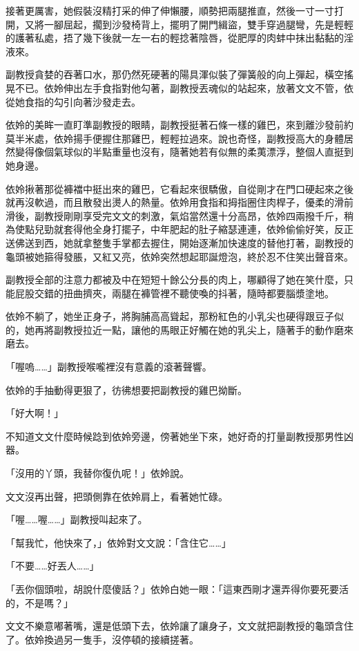 接著更厲害，她假裝沒精打采的伸了伸懶腰，順勢把兩腿推直，然後一寸一寸打開，又將一腳屈起，擱到沙發椅背上，擺明了開門緝盜，雙手穿過腿彎，先是輕輕的護著私處，捂了幾下後就一左一右的輕捻著陰唇，從肥厚的肉蚌中抹出黏黏的淫液來。

副教授貪婪的吞著口水，那仍然死硬著的陽具渾似裝了彈簧般的向上彈起，橫空搖晃不已。依姈伸出左手食指對他勾著，副教授丟魂似的站起來，放著文文不管，依從她食指的勾引向著沙發走去。

依姈的美眸一直盯準副教授的眼睛，副教授挺著石條一樣的雞巴，來到離沙發前約莫半米處，依姈揚手便握住那雞巴，輕輕拉過來。說也奇怪，副教授高大的身體居然變得像個氣球似的半點重量也沒有，隨著她若有似無的柔荑漂浮，整個人直挺到她身邊。

依姈揪著那從褲襠中挺出來的雞巴，它看起來很驕傲，自從剛才在門口硬起來之後就再沒軟過，而且散發出燙人的熱量。依姈用食指和拇指圈住肉桿子，優柔的滑前滑後，副教授剛剛享受完文文的刺激，氣焰當然還十分高昂，依姈四兩撥千斤，稍為使點兒勁就套得他全身打擺子，中年肥起的肚子縮瑟連連，依姈偷偷好笑，反正送佛送到西，她就拿整隻手掌都去握住，開始逐漸加快速度的替他打著，副教授的龜頭被她箍得發脹，又紅又亮，依姈突然想起耶誕燈泡，終於忍不住笑出聲音來。

副教授全部的注意力都被及中在短短十餘公分長的肉上，哪顧得了她在笑什麼，只能屁股交錯的扭曲擠夾，兩腿在褲管裡不聽使喚的抖著，隨時都要腦漿塗地。

依姈不躺了，她坐正身子，將胸脯高高聳起，那粉紅色的小乳尖也硬得跟豆子似的，她再將副教授拉近一點，讓他的馬眼正好觸在她的乳尖上，隨著手的動作磨來磨去。

「喔嗚……」副教授喉嚨裡沒有意義的滾著聲響。

依姈的手抽動得更狠了，彷彿想要把副教授的雞巴拗斷。

「好大啊！」

不知道文文什麼時候踗到依姈旁邊，傍著她坐下來，她好奇的打量副教授那男性凶器。

「沒用的丫頭，我替你復仇呢！」依姈說。

文文沒再出聲，把頭側靠在依姈肩上，看著她忙碌。

「喔……喔……」副教授叫起來了。

「幫我忙，他快來了，」依姈對文文說：「含住它……」

「不要……好丟人……」

「丟你個頭啦，胡說什麼傻話？」依姈白她一眼：「這東西剛才還弄得你要死要活的，不是嗎？」

文文不樂意嘟著嘴，還是低頭下去，依姈讓了讓身子，文文就把副教授的龜頭含住了。依姈換過另一隻手，沒停頓的接續搓著。

